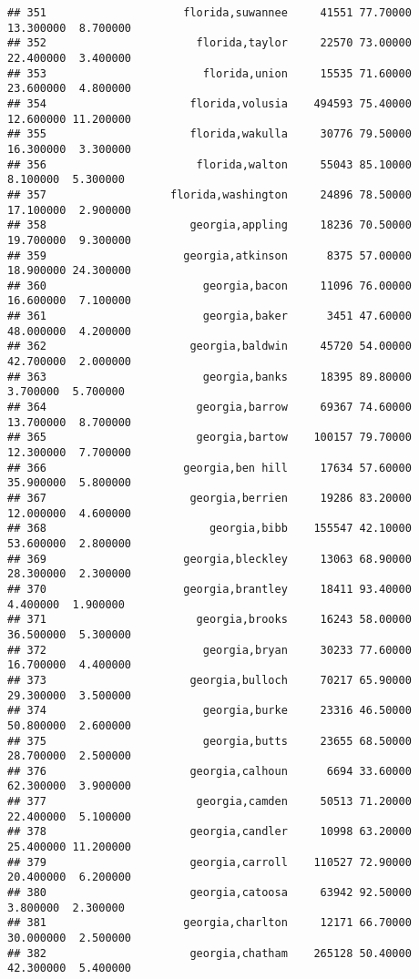 \documentclass[
]{article}
\begin{document}
\begin{verbatim}
## 351                     florida,suwannee     41551 77.70000 13.300000  8.700000
## 352                       florida,taylor     22570 73.00000 22.400000  3.400000
## 353                        florida,union     15535 71.60000 23.600000  4.800000
## 354                      florida,volusia    494593 75.40000 12.600000 11.200000
## 355                      florida,wakulla     30776 79.50000 16.300000  3.300000
## 356                       florida,walton     55043 85.10000  8.100000  5.300000
## 357                   florida,washington     24896 78.50000 17.100000  2.900000
## 358                      georgia,appling     18236 70.50000 19.700000  9.300000
## 359                     georgia,atkinson      8375 57.00000 18.900000 24.300000
## 360                        georgia,bacon     11096 76.00000 16.600000  7.100000
## 361                        georgia,baker      3451 47.60000 48.000000  4.200000
## 362                      georgia,baldwin     45720 54.00000 42.700000  2.000000
## 363                        georgia,banks     18395 89.80000  3.700000  5.700000
## 364                       georgia,barrow     69367 74.60000 13.700000  8.700000
## 365                       georgia,bartow    100157 79.70000 12.300000  7.700000
## 366                     georgia,ben hill     17634 57.60000 35.900000  5.800000
## 367                      georgia,berrien     19286 83.20000 12.000000  4.600000
## 368                         georgia,bibb    155547 42.10000 53.600000  2.800000
## 369                     georgia,bleckley     13063 68.90000 28.300000  2.300000
## 370                     georgia,brantley     18411 93.40000  4.400000  1.900000
## 371                       georgia,brooks     16243 58.00000 36.500000  5.300000
## 372                        georgia,bryan     30233 77.60000 16.700000  4.400000
## 373                      georgia,bulloch     70217 65.90000 29.300000  3.500000
## 374                        georgia,burke     23316 46.50000 50.800000  2.600000
## 375                        georgia,butts     23655 68.50000 28.700000  2.500000
## 376                      georgia,calhoun      6694 33.60000 62.300000  3.900000
## 377                       georgia,camden     50513 71.20000 22.400000  5.100000
## 378                      georgia,candler     10998 63.20000 25.400000 11.200000
## 379                      georgia,carroll    110527 72.90000 20.400000  6.200000
## 380                      georgia,catoosa     63942 92.50000  3.800000  2.300000
## 381                     georgia,charlton     12171 66.70000 30.000000  2.500000
## 382                      georgia,chatham    265128 50.40000 42.300000  5.400000

\end{verbatim}
\end{document}
